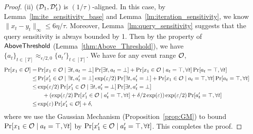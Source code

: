 \begin{proof}
(ii) $(\mathcal{D}_1,\mathcal{D}_1')$ is $(1/\tau)$-aligned.
In this case, by Lemma~\ref{lm:ite_sensitivity_base} and Lemma~\ref{lm:iteration_sensitivity}, we know $\|x_t-y_t\|_\infty\le 6\eta/\tau$.
Moreover, Lemma~\ref{lm:query_sensitivity} suggests that the query sensitivity is always bounded by 1.
Then by the property of $\mathsf{AboveThreshold}$ (Lemma~\ref{thm:Above_Threshold}), we have $\{a_t\}_{t\in[T]}\approx_{\epsilon/2,0}\{a_t'\}_{t\in[T]}$.
We have for any event range $\mathcal{O}$,
\begin{align*}
\Pr[x_1\in\mathcal{O}]=& \Pr[x_1\in\mathcal{O} \mid \exists t,a_t=\bot]\Pr[\exists t,a_t=\bot]  +\Pr[x_1\in\mathcal{O}\mid a_t=\top,\forall t]\Pr[a_t=\top,\forall t]\\
 \le & \Pr[x_1'\in\mathcal{O} \mid \exists t,a_t'=\bot]\exp(\varepsilon/2)\Pr[\exists t,a_t'=\bot]+\Pr[x_1\in\mathcal{O}\mid a_t=\top,\forall t]\Pr[a_t=\top,\forall t]\\
 \le& \exp(\varepsilon/2)\Pr[x_1'\in\mathcal{O} \mid \exists t,a_t'=\bot]\Pr[\exists t,a_t'=\bot]\\
 &~~~+(\exp(\varepsilon/2)\Pr[x_1'\in\mathcal{O}\mid a_t'=\top,\forall t]+\delta/2\exp(\varepsilon))\exp(\varepsilon/2)\Pr[a_t'=\top,\forall t]\\
 \le& \exp(\varepsilon)\Pr[x_1'\in\mathcal{O}]+\delta,
\end{align*}
where we use the Gaussian Mechanism (Proposition~\ref{prop:GM}) to bound $\Pr[x_1\in\mathcal{O}\mid a_t=\top,\forall t]$ by $\Pr[x_1'\in\mathcal{O}\mid a_t'=\top,\forall t]$.
This completes the proof.





\end{proof}
